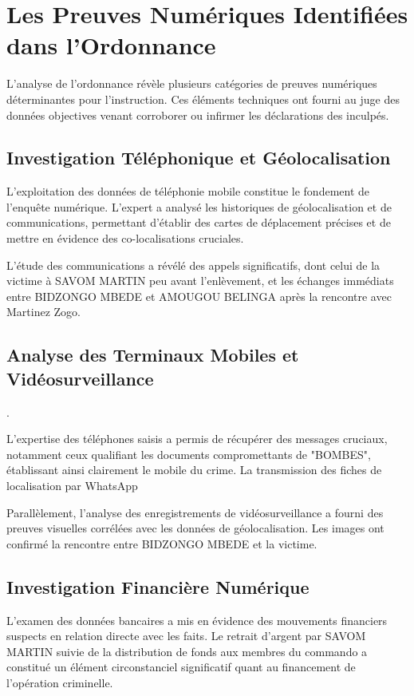 \documentclass[12pt, a4paper]{article}
\begin{document}
\section{Les Preuves Numériques Identifiées dans l'Ordonnance}

L'analyse de l'ordonnance révèle plusieurs catégories de preuves numériques déterminantes pour l'instruction. Ces éléments techniques ont fourni au juge des données objectives venant corroborer ou infirmer les déclarations des inculpés.

\subsection{Investigation Téléphonique et Géolocalisation}

L'exploitation des données de téléphonie mobile constitue le fondement de l'enquête numérique. L'expert a analysé les historiques de géolocalisation et de communications, permettant d'établir des cartes de déplacement précises et de mettre en évidence des co-localisations cruciales.

L'étude des communications a révélé des appels significatifs, dont celui de la victime à SAVOM MARTIN peu avant l'enlèvement, et les échanges immédiats entre BIDZONGO MBEDE et AMOUGOU BELINGA après la rencontre avec Martinez Zogo.

\subsection{Analyse des Terminaux Mobiles et Vidéosurveillance}.

L'expertise des téléphones saisis a permis de récupérer des messages cruciaux, notamment ceux qualifiant les documents compromettants de "BOMBES", établissant ainsi clairement le mobile du crime. La transmission des fiches de localisation par WhatsApp

Parallèlement, l'analyse des enregistrements de vidéosurveillance a fourni des preuves visuelles corrélées avec les données de géolocalisation. Les images ont confirmé la rencontre entre BIDZONGO MBEDE et la victime.

\subsection{Investigation Financière Numérique}

L'examen des données bancaires a mis en évidence des mouvements financiers suspects en relation directe avec les faits. Le retrait d'argent par SAVOM MARTIN suivie de la distribution de fonds aux membres du commando a constitué un élément circonstanciel significatif quant au financement de l'opération criminelle.
\end{document}
